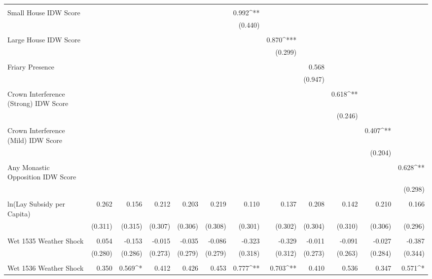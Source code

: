 \begin{table}[H]
\begin{tabular}{@{\extracolsep{.5pt}}lD{.}{.}{-3} D{.}{.}{-3} D{.}{.}{-3} D{.}{.}{-3} D{.}{.}{-3} D{.}{.}{-3} D{.}{.}{-3} D{.}{.}{-3} D{.}{.}{-3} D{.}{.}{-3} D{.}{.}{-3} }
  & & & & & & & & & & & \\ 
 Small House IDW Score &  &  &  &  &  & 0.992^{**} &  &  &  &  &  \\ 
  &  &  &  &  &  & (0.440) &  &  &  &  &  \\ 
  & & & & & & & & & & & \\ 
 Large House IDW Score &  &  &  &  &  &  & 0.870^{***} &  &  &  &  \\ 
  &  &  &  &  &  &  & (0.299) &  &  &  &  \\ 
  & & & & & & & & & & & \\ 
 Friary Presence &  &  &  &  &  &  &  & 0.568 &  &  &  \\ 
  &  &  &  &  &  &  &  & (0.947) &  &  &  \\ 
  & & & & & & & & & & & \\ 
 Crown Interference (Strong) IDW Score &  &  &  &  &  &  &  &  & 0.618^{**} &  &  \\ 
  &  &  &  &  &  &  &  &  & (0.246) &  &  \\ 
  & & & & & & & & & & & \\ 
 Crown Interference (Mild) IDW Score &  &  &  &  &  &  &  &  &  & 0.407^{**} &  \\ 
  &  &  &  &  &  &  &  &  &  & (0.204) &  \\ 
  & & & & & & & & & & & \\ 
 Any Monastic Opposition IDW Score &  &  &  &  &  &  &  &  &  &  & 0.628^{**} \\ 
  &  &  &  &  &  &  &  &  &  &  & (0.298) \\ 
  & & & & & & & & & & & \\ 
 ln(Lay Subsidy per Capita) & 0.262 & 0.156 & 0.212 & 0.203 & 0.219 & 0.110 & 0.137 & 0.208 & 0.142 & 0.210 & 0.166 \\ 
  & (0.311) & (0.315) & (0.307) & (0.306) & (0.308) & (0.301) & (0.302) & (0.304) & (0.310) & (0.306) & (0.296) \\ 
  & & & & & & & & & & & \\ 
 Wet 1535 Weather Shock & 0.054 & -0.153 & -0.015 & -0.035 & -0.086 & -0.323 & -0.329 & -0.011 & -0.091 & -0.027 & -0.387 \\ 
  & (0.280) & (0.286) & (0.273) & (0.279) & (0.279) & (0.318) & (0.312) & (0.273) & (0.263) & (0.284) & (0.344) \\ 
  & & & & & & & & & & & \\ 
 Wet 1536 Weather Shock & 0.350 & 0.569^{*} & 0.412 & 0.426 & 0.453 & 0.777^{**} & 0.703^{**} & 0.410 & 0.536 & 0.347 & 0.571^{*} \\ 

\end{tabular}
\end{table}
